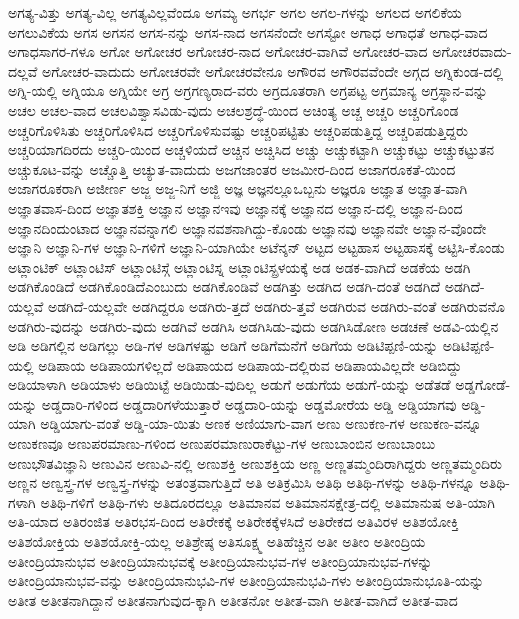{ಅಗತ್ಯ-ವಿತ್ತು
ಅಗತ್ಯ-ವಿಲ್ಲ
ಅಗತ್ಯವಿಲ್ಲವೆಂದೂ
ಅಗಮ್ಯ
ಅಗರ್ಭ
ಅಗಲ
ಅಗಲ-ಗಳನ್ನು
ಅಗಲದ
ಅಗಲಿಕೆಯ
ಅಗಲುವಿಕೆಯ
ಅಗಸ
ಅಗಸನ
ಅಗಸ-ನನ್ನು
ಅಗಸ-ನಾದ
ಅಗಸನೆಂದೇ
ಅಗಸ್ಟೋ
ಅಗಾಧ
ಅಗಾಧತೆ
ಅಗಾಧ-ವಾದ
ಅಗಾಧಸಾಗರ-ಗಳೂ
ಅಗೋ
ಅಗೋಚರ
ಅಗೋಚರ-ನಾದ
ಅಗೋಚರ-ವಾಗಿವೆ
ಅಗೋಚರ-ವಾದ
ಅಗೋಚರವಾದು-ದಲ್ಲವೆ
ಅಗೋಚರ-ವಾದುದು
ಅಗೋಚರವೇ
ಅಗೋಚರವೇನೂ
ಅಗೌರವ
ಅಗೌರವವೆಂದೇ
ಅಗ್ಗದ
ಅಗ್ನಿಕುಂಡ-ದಲ್ಲಿ
ಅಗ್ನಿ-ಯಲ್ಲಿ
ಅಗ್ನಿಯೂ
ಅಗ್ನಿಯೇ
ಅಗ್ರ
ಅಗ್ರಗಣ್ಯರಾದ-ವರು
ಅಗ್ರದೂತರಾಗಿ
ಅಗ್ರಪಟ್ಟ
ಅಗ್ರಮಾನ್ಯ
ಅಗ್ರಸ್ಥಾನ-ವನ್ನು
ಅಚಲ
ಅಚಲ-ವಾದ
ಅಚಲವಿಶ್ವಾಸವಿಡು-ವುದು
ಅಚಲಶ್ರದ್ಧೆ-ಯಿಂದ
ಅಚಿಂತ್ಯ
ಅಚ್ಚ
ಅಚ್ಚರಿ
ಅಚ್ಚರಿಗೊಂಡ
ಅಚ್ಚರಿಗೊಳಿಸಿತು
ಅಚ್ಚರಿಗೊಳಿಸಿದ
ಅಚ್ಚರಿಗೊಳಿಸುವಷ್ಟು
ಅಚ್ಚರಿಪಟ್ಟಿತು
ಅಚ್ಚರಿಪಡುತ್ತಿದ್ದ
ಅಚ್ಚರಿಪಡುತ್ತಿದ್ದರು
ಅಚ್ಚರಿಯಾಗದಿರದು
ಅಚ್ಚರಿ-ಯಿಂದ
ಅಚ್ಚಳಿಯದೆ
ಅಚ್ಚಿನ
ಅಚ್ಚಿಸಿದ
ಅಚ್ಚು
ಅಚ್ಚುಕಟ್ಟಾಗಿ
ಅಚ್ಚುಕಟ್ಟು
ಅಚ್ಚುಕಟ್ಟುತನ
ಅಚ್ಚುಕೂಟ-ವನ್ನು
ಅಚ್ಚೊತ್ತಿ
ಅಚ್ಯುತ-ವಾದುದು
ಅಜಗಜಾಂತರ
ಅಜಮೀರ-ದಿಂದ
ಅಜಾಗರೂಕತೆ-ಯಿಂದ
ಅಜಾಗರೂಕರಾಗಿ
ಅಜೀರ್ಣ
ಅಜ್ಜ
ಅಜ್ಜ-ನಿಗೆ
ಅಜ್ಜಿ
ಅಜ್ಞ
ಅಜ್ಞನಲ್ಲೂಒಬ್ಬನು
ಅಜ್ಞರೂ
ಅಜ್ಞಾತ
ಅಜ್ಞಾತ-ವಾಗಿ
ಅಜ್ಞಾತವಾಸ-ದಿಂದ
ಅಜ್ಞಾತಶಕ್ತಿ
ಅಜ್ಞಾನ
ಅಜ್ಞಾನಇವು
ಅಜ್ಞಾನಕ್ಕೆ
ಅಜ್ಞಾನದ
ಅಜ್ಞಾನ-ದಲ್ಲಿ
ಅಜ್ಞಾನ-ದಿಂದ
ಅಜ್ಞಾನದಿಂದುಂಟಾದ
ಅಜ್ಞಾನವನ್ನಾಗಲಿ
ಅಜ್ಞಾನವಶನಾಗಿದ್ದು-ಕೊಂಡು
ಅಜ್ಞಾನವು
ಅಜ್ಞಾನವೇ
ಅಜ್ಞಾನ-ವೊಂದೇ
ಅಜ್ಞಾನಿ
ಅಜ್ಞಾನಿ-ಗಳ
ಅಜ್ಞಾನಿ-ಗಳಿಗೆ
ಅಜ್ಞಾನಿ-ಯಾಗಿಯೇ
ಅಟೆನ್ಶನ್
ಅಟ್ಟದ
ಅಟ್ಟಹಾಸ
ಅಟ್ಟಹಾಸಕ್ಕೆ
ಅಟ್ಟಿಸಿ-ಕೊಂಡು
ಅಟ್ಲಾಂಟಿಕ್
ಅಟ್ಲಾಂಟಿಸ್
ಅಟ್ಲಾಂಟಿಸ್ಗೆ
ಅಟ್ಲಾಂಟಿಸ್ನ
ಅಟ್ಲಾಂಟಿಸ್ಪ್ರಳಯಕ್ಕೆ
ಅಡ
ಅಡಕ-ವಾಗಿದೆ
ಅಡಕೆಯ
ಅಡಗಿ
ಅಡಗಿಕೊಂಡಿದೆ
ಅಡಗಿಕೊಂಡಿದೆಎಂಬುದು
ಅಡಗಿಕೊಂಡಿವೆ
ಅಡಗಿತ್ತು
ಅಡಗಿದ
ಅಡಗಿ-ದಂತೆ
ಅಡಗಿದೆ
ಅಡಗಿದೆ-ಯಲ್ಲವೆ
ಅಡಗಿದೆ-ಯಲ್ಲವೇ
ಅಡಗಿದ್ದರೂ
ಅಡಗಿರು-ತ್ತದೆ
ಅಡಗಿರು-ತ್ತವೆ
ಅಡಗಿರುವ
ಅಡಗಿರು-ವಂತೆ
ಅಡಗಿರುವನೊ
ಅಡಗಿರು-ವುದನ್ನು
ಅಡಗಿರು-ವುದು
ಅಡಗಿವೆ
ಅಡಗಿಸಿ
ಅಡಗಿಸಿಡು-ವುದು
ಅಡಗಿಸಿಡೋಣ
ಅಡಚಣೆ
ಅಡವಿ-ಯಲ್ಲಿನ
ಅಡಿ
ಅಡಿಗಲ್ಲಿನ
ಅಡಿಗಲ್ಲು
ಅಡಿ-ಗಳ
ಅಡಿಗಳಷ್ಟು
ಅಡಿಗೆ
ಅಡಿಗೆಮನೆಗೆ
ಅಡಿಗೆಯ
ಅಡಿಟಿಪ್ಪಣಿ-ಯನ್ನು
ಅಡಿಟಿಪ್ಪಣಿ-ಯಲ್ಲಿ
ಅಡಿಪಾಯ
ಅಡಿಪಾಯಗಳಿಲ್ಲದೆ
ಅಡಿಪಾಯದ
ಅಡಿಪಾಯ-ದಲ್ಲಿರುವ
ಅಡಿಪಾಯವಿಲ್ಲದೇ
ಅಡಿಬಿದ್ದು
ಅಡಿಯಾಳಾಗಿ
ಅಡಿಯಾಳು
ಅಡಿಯಿಟ್ಟೆ
ಅಡಿಯಿಡು-ವುದಿಲ್ಲ
ಅಡುಗೆ
ಅಡುಗೆಯ
ಅಡುಗೆ-ಯನ್ನು
ಅಡೆತಡೆ
ಅಡ್ಡಗೋಡೆ-ಯನ್ನು
ಅಡ್ಡದಾರಿ-ಗಳಿಂದ
ಅಡ್ಡದಾರಿಗಳೆಯುತ್ತಾರೆ
ಅಡ್ಡದಾರಿ-ಯನ್ನು
ಅಡ್ಡಮೋರೆಯ
ಅಡ್ಡಿ
ಅಡ್ಡಿಯಾಗವು
ಅಡ್ಡಿ-ಯಾಗಿ
ಅಡ್ಡಿಯಾಗು-ವಂತೆ
ಅಡ್ಡಿ-ಯಾ-ಯಿತು
ಅಣಕ
ಅಣಿಯಾಗು-ವಾಗ
ಅಣು
ಅಣುಕಣ-ಗಳ
ಅಣುಕಣ-ವನ್ನೂ
ಅಣುಕಣವೂ
ಅಣುಪರಮಾಣು-ಗಳಿಂದ
ಅಣುಪರಮಾಣುರಾಕೆಟ್ಟು-ಗಳ
ಅಣುಬಾಂಬಿನ
ಅಣುಬಾಂಬು
ಅಣುಭೌತವಿಜ್ಞಾನಿ
ಅಣುವಿನ
ಅಣುವಿ-ನಲ್ಲಿ
ಅಣುಶಕ್ತಿ
ಅಣುಶಕ್ತಿಯ
ಅಣ್ಣ
ಅಣ್ಣತಮ್ಮಂದಿರಾಗಿದ್ದರು
ಅಣ್ಣತಮ್ಮಂದಿರು
ಅಣ್ಣನ
ಅಣ್ವಸ್ತ್ರ-ಗಳ
ಅಣ್ವಸ್ತ್ರ-ಗಳನ್ನು
ಅತಂತ್ರವಾಗುತ್ತಿದೆ
ಅತಿ
ಅತಿಕ್ರಮಿಸಿ
ಅತಿಥಿ
ಅತಿಥಿ-ಗಳನ್ನು
ಅತಿಥಿ-ಗಳನ್ನೂ
ಅತಿಥಿ-ಗಳಾಗಿ
ಅತಿಥಿ-ಗಳಿಗೆ
ಅತಿಥಿ-ಗಳು
ಅತಿದೂರದಲ್ಲೂ
ಅತಿಮಾನವ
ಅತಿಮಾನಸಕ್ಷೇತ್ರ-ದಲ್ಲಿ
ಅತಿಮಾನುಷ
ಅತಿ-ಯಾಗಿ
ಅತಿ-ಯಾದ
ಅತಿರಂಜಿತ
ಅತಿರಭಸ-ದಿಂದ
ಅತಿರೇಕಕ್ಕೆ
ಅತಿರೇಕಕ್ಕೆಳಸಿದೆ
ಅತಿರೇಕದ
ಅತಿವಿರಳ
ಅತಿಶಯೋಕ್ತಿ
ಅತಿಶಯೋಕ್ತಿಯ
ಅತಿಶಯೋಕ್ತಿ-ಯಲ್ಲ
ಅತಿಶ್ರೇಷ್ಠ
ಅತಿಸೂಕ್ಷ್ಮ
ಅತಿಹೆಚ್ಚಿನ
ಅತೀ
ಅತೀಂ
ಅತೀಂದ್ರಿಯ
ಅತೀಂದ್ರಿಯಾನುಭವ
ಅತೀಂದ್ರಿಯಾನುಭವಕ್ಕೆ
ಅತೀಂದ್ರಿಯಾನುಭವ-ಗಳ
ಅತೀಂದ್ರಿಯಾನುಭವ-ಗಳನ್ನು
ಅತೀಂದ್ರಿಯಾನುಭವ-ವನ್ನು
ಅತೀಂದ್ರಿಯಾನುಭವಿ-ಗಳ
ಅತೀಂದ್ರಿಯಾನುಭವಿ-ಗಳು
ಅತೀಂದ್ರಿಯಾನುಭೂತಿ-ಯನ್ನು
ಅತೀತ
ಅತೀತನಾಗಿದ್ದಾನೆ
ಅತೀತನಾಗುವುದ-ಕ್ಕಾಗಿ
ಅತೀತನೋ
ಅತೀತ-ವಾಗಿ
ಅತೀತ-ವಾಗಿದೆ
ಅತೀತ-ವಾದ
}
